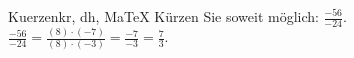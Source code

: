 \begin{MAufgabe}{Kuerzen}{kr, dh, MaTeX}
K\"urzen Sie soweit m\"oglich: $\frac{-56}{-24}$.\\ 
\ifLsg\MLoesung
\quad $\frac{-56}{-24}=\frac{(8)\cdot(-7)}{(8)\cdot(-3)}=\frac{-7}{-3}=\frac{7}{3}$.\else\relax\fi
 \end{MAufgabe}